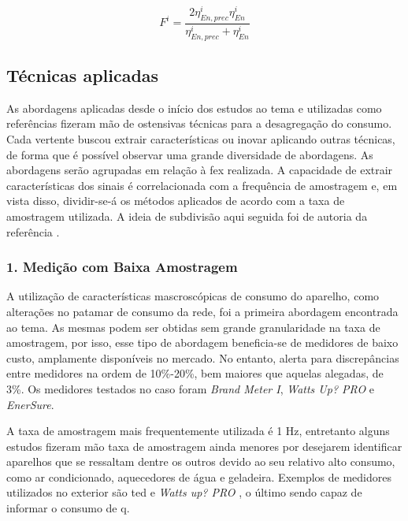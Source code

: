 \begin{equation}\label{eq:fmeasure}
F^i=\frac{2 \eta_{En,prec}^i \eta_{En}^i}{\eta_{En,prec}^i+\eta_{En}^i}
\end{equation}

\subsection{Técnicas aplicadas}
\label{ssec:nilm_tecnicas}

As abordagens aplicadas desde o início dos estudos ao tema e
utilizadas como referências fizeram mão de ostensivas técnicas para a
desagregação do consumo. Cada vertente buscou extrair características
ou inovar aplicando outras técnicas, de forma que é possível observar
uma grande diversidade de abordagens. As abordagens serão agrupadas em
relação à \gls{fex} realizada. A capacidade de extrair
características dos sinais é correlacionada com a frequência de
amostragem e, em vista disso, dividir-se-á os métodos aplicados de
acordo com a taxa de amostragem utilizada. A ideia de subdivisão aqui
seguida foi de autoria da referência \cite{nilm_zeifman_review_2011}.

\subsubsection{1. Medição com Baixa Amostragem}
\label{top:nilm_baixa_am}

A utilização de características mascroscópicas de consumo do aparelho,
como alterações no patamar de consumo da rede, foi a
primeira abordagem encontrada ao tema. As mesmas podem ser obtidas sem
grande granularidade na taxa de amostragem, por isso, esse tipo de
abordagem beneficia-se de medidores de baixo custo, amplamente
disponíveis no mercado. No entanto, \cite{nilm_berges_2008_7} alerta
para discrepâncias entre medidores na ordem de 10\%-20\%, bem maiores
que aquelas alegadas, de 3\%. Os medidores testados no caso foram
\emph{Brand Meter I}, \emph{Watts Up? PRO} e \emph{EnerSure}.

A taxa de amostragem mais frequentemente utilizada é 1 Hz, entretanto
alguns estudos fizeram mão taxa de amostragem ainda menores por
desejarem identificar aparelhos que se ressaltam dentre os outros
devido ao seu relativo alto consumo, como ar condicionado, aquecedores
de água e geladeira. Exemplos de medidores utilizados no exterior são
\gls{ted} \cite{ted_site} e \emph{Watts up? PRO} \cite{wattsup_site},
o último sendo capaz de informar o consumo de \acrlong{q}.

